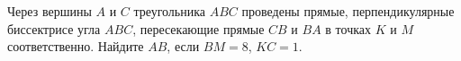Через вершины $A$ и $C$ треугольника $ABC$ проведены прямые, перпендикулярные биссектрисе угла $ABC$, пересекающие прямые $CB$ и $BA$ в точках $K$ и $M$ соответственно. Найдите $AB$, если $BM = 8$, $KC = 1$.